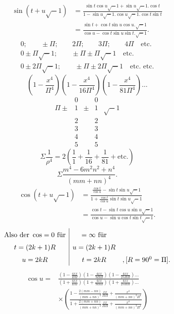 \[\begin{aligned}
\sin(t+u\surd-1)&=\frac{\sin t\cos u\surd-1+\sin u\surd-1.\cos t}{1-\sin u\surd-1.\cos u\surd-1.\cos t\sin t}\\[6pt]
&=\frac{\sin t+\cos t\sin u\cos u.\surd-1}{\cos u-\cos t\sin u\sin t.\surd-1}.
\end{aligned}\]
\noindent{\small [S. 88]}
\[\begin{gathered}
0;\qquad\pm\Pi;\qquad2\Pi;\qquad3\Pi;\qquad4\Pi\quad\text{etc.}\\
0\pm\Pi\surd-1;\qquad\pm\Pi\pm\Pi\surd-1\quad\text{etc.}\\
0\pm2\Pi\surd-1;\qquad\pm\Pi\pm2\Pi\surd-1\quad\text{etc. etc.}
\end{gathered}\]
\[\left(1-\frac{x^4}{\Pi^4}\right)\left(1-\frac{x^4}{16\Pi^4}\right)\left(1-\frac{x^4}{81\Pi^4}\right)\ldots\]
\clearpage
{}\fancyhead{}
\[\begin{array}{r|rcr|l}
&0&&0&\\\Pi\pm&1&\pm&1&\surd-1\\&2&&2&\\&3&&3&\\&4&&4&\\&5&&5&
\end{array}\]
\[\Sigma\frac1{\rho^4}=2\left(\frac11+\frac1{16}+\frac1{81}+\text{etc.}\right)\]
\[\Sigma\frac{m^4-6m^2n^2+n^4}{(mm+nn)^4}.\]
\noindent{\small [S. 89]}
\[\begin{aligned}
\cos(t+u\surd-1)&=\frac{\frac{\cos t}{\cos u}-\sin t\sin u\surd-1}{1+\frac{\cos t}{\cos u}\sin t\sin u\surd-1}\\[6pt]
&=\frac{\cos t-\sin t\cos u\sin u\surd-1}{\cos u-\sin u\cos t\sin t\surd-1}.
\end{aligned}\]
\[\renewcommand{\arraystretch}{1.5}\begin{array}{c|c@{\quad}l}
\text{Also der }\cos=0\text{ für}&=\infty\text{ für}&\\
t=(2k+1)R&u=(2k+1)R&\\u=2kR&t=2kR&,[R=90^0=\Pi].
\end{array}\]
\[\begin{aligned}
\cos u={}&\frac{\left(1-\frac{4xx}{\Pi\Pi}\right)\left(1-\frac{4xx}{9\Pi\Pi}\right)\left(1-\frac{4xx}{25\Pi\Pi}\right)\ldots}
{\left(1+\frac{4xx}{\Pi\Pi}\right)\left(1+\frac{4xx}{9\Pi\Pi}\right)\left(1+\frac{4xx}{25\Pi\Pi}\right)\ldots}\\[9pt]
&\times\left(\frac{1-\frac{2(mm-nn)}{(mm+nn)^2}\frac{xx}{\Pi\Pi}+\frac{x^4}{(mm+nn)^2\Pi^4}}
{1+\frac{2(mm+nn)}{(mm+nn)^2}\frac{xx}{\Pi\Pi}+\frac{x^4}{(mm+nn)^2\Pi^4}}\right)
\end{aligned}\]
